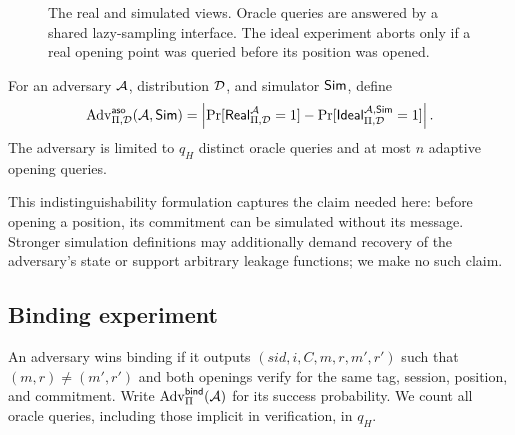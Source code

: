 \begin{figure}[t]
\centering
{}
\caption{The real and simulated views.  Oracle queries are answered by a
shared lazy-sampling interface.  The ideal experiment aborts only if a real
opening point was queried before its position was opened.}
\label{fig:games}
\end{figure}

\begin{definition}
For an adversary $\mathcal{A}$, distribution $\mathcal{D}$, and simulator $\mathsf{Sim}$, define
\[
 \operatorname{Adv}^{\mathsf{aso}}_{\Pi,\mathcal{D}}(\mathcal{A},\mathsf{Sim})
 =\left|\Pr[\mathsf{Real}^{\mathcal{A}}_{\Pi,\mathcal{D}}=1]
          -\Pr[\mathsf{Ideal}^{\mathcal{A},\mathsf{Sim}}_{\Pi,\mathcal{D}}=1]\right|.
\]
The adversary is limited to $q_H$ distinct oracle queries and at most $n$
adaptive opening queries.
\end{definition}

This indistinguishability formulation captures the claim needed here: before
opening a position, its commitment can be simulated without its message.
Stronger simulation definitions may additionally demand recovery of the
adversary's state or support arbitrary leakage functions; we make no such
claim.

\subsection{Binding experiment}

An adversary wins binding if it outputs
$(sid,i,C,m,r,m',r')$ such that $(m,r)\neq(m',r')$ and both openings verify for
the same tag, session, position, and commitment.  Write
$\operatorname{Adv}^{\mathsf{bind}}_\Pi(\mathcal{A})$ for its success probability.  We count all
oracle queries, including those implicit in verification, in $q_H$.
